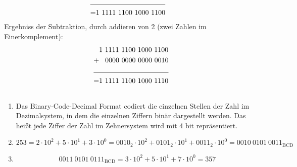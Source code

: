 \documentclass[DIN, pagenumber=false, fontsize=11pt, parskip=half]{scrartcl}
\begin{document}
\begin{enumerate}[label = (\alph*)]
\begin{align*}
                \cline{1-2}  
                = & 1\ 1111\ 1100\ 1000\ 1100
            \end{align*}
            Ergebniss der Subtraktion, durch addieren von 2 (zwei Zahlen im Einerkomplement):
            \begin{align*}
                & 1\ 1111\ 1100\ 1000\ 1100 \\
                + & \hspace{0.3cm}0000\ 0000\ 0000\ 0010\\
                \cline{1-2}  
                = & 1\ 1111\ 1100\ 1000\ 1110
            \end{align*}
    \end{enumerate}

    \subsection{}
    \begin{enumerate}[label = (\alph*)]
        \item Das Binary-Code-Decimal Format codiert die einzelnen Stellen der Zahl im Dezimalsystem, in dem die einzelnen Ziffern binär dargestellt werden.
            Das heißt jede Ziffer der Zahl im Zehnersystem  wird mit 4 bit repräsentiert.
        \item 
            \begin{equation*}
                253 = 2 \cdot 10^2 + 5 \cdot 10^1 + 3 \cdot 10^0 = {0010}_2 \cdot 10^2 + {0101}_2 \cdot 10^1 + {0011}_2 \cdot 10^0 = {0010\ 0101\ 0011}_\text{BCD}
            \end{equation*}
        \item 
            \begin{equation*}
                {0011\ 0101\ 0111}_\text{BCD} = 3 \cdot 10^2 + 5 \cdot 10^1 + 7 \cdot 10^0 = 357
            \end{equation*}
    \end{enumerate}
\end{document}
